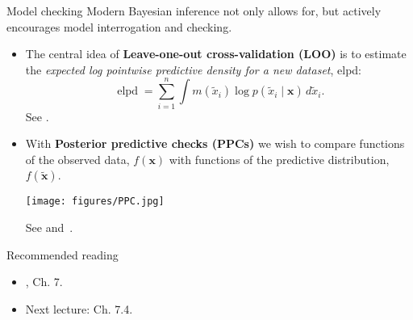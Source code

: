 \begin{frame}{Model checking}
Modern Bayesian inference not only allows for, but actively encourages model interrogation and checking.
\begin{itemize}
 \item The central idea of \textbf{Leave-one-out cross-validation (LOO)} is to estimate the \textit{expected log pointwise predictive density for a new dataset}, elpd:
 \begin{equation*}
  \operatorname{elpd} = \sum_{i=1}^n \int m(\tilde{x}_i)\log p(\tilde{x}_i \mid \boldsymbol{x})\,d\tilde{x}_i.
 \end{equation*}
 See \cite{Vehtari2017}.
 \item With \textbf{Posterior predictive checks (PPCs)} we wish to compare  functions of the observed data, $f(\boldsymbol{x})$ with functions of the predictive distribution, $f(\boldsymbol{\tilde{x}})$.
  \begin{center}
 \texttt{[image: figures/PPC.jpg]}
\end{center}
 See \cite{Berkhof2000} and~\cite{Gabry2019}.
\end{itemize}
\end{frame}
\begin{frame}{Recommended reading}
\begin{itemize}
  \item[\faBook] \cite{Robert2007}, Ch. 7.
 \item[\faForward] Next lecture: \cite{Schervish1995} Ch. 7.4.
 \end{itemize} 
\end{frame}
